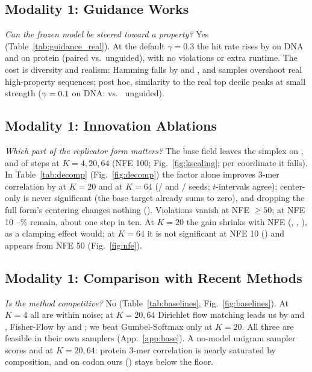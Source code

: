 \documentclass{article}
\begin{document}
\subsection{Modality 1: Guidance Works}
\emph{Can the frozen model be steered toward a property?} Yes (Table~\ref{tab:guidance_real}). At the
default $\gamma=0.3$ the hit rate rises by \GRHitCIDna{} on DNA and \GRHitCIProt{} on protein
(paired vs.\ unguided), with no violations or extra runtime. The cost is diversity and realism:
Hamming falls by \GRHamCIDna{} and \GRHamCIProt, and samples overshoot real high-property
sequences; post hoc, similarity to the real top decile peaks at small strength ($\gamma=0.1$
on DNA: \GRKmerHiMidDna{} vs.\ \GRKmerHiZeroDna{} unguided).


\subsection{Modality 1: Innovation Ablations}
\emph{Which part of the replicator form matters?} The base field leaves the simplex on
\BaseViolDna, \BaseViolProt{} and \BaseViolCodon{} of steps at $K=4,20,64$ (NFE 100;
Fig.~\ref{fig:kscaling}; per coordinate it falls). In
Table~\ref{tab:decomp} (Fig.~\ref{fig:decomp}) the factor alone improves 3-mer correlation by \MultCIProt{} at $K=20$
and \MultCICodon{} at $K=64$ (\MultProtPos/\MultProtN{} and \MultCodonPos/\MultCodonN{} seeds; $t$-intervals agree); center-only
is never significant (the base target already sums to zero), and dropping the full form's centering
changes nothing (\DropCenterCICodon). Violations vanish at NFE $\ge50$; at NFE 10
\MultViolTenLo--\MultViolTenHi\% remain, about one step in ten. At $K=20$ the gain shrinks with NFE (\MultMeanProtTen, \MultMeanProtFifty,
\MultMeanProtHundred), as a clamping effect would; at $K=64$ it is not significant at NFE 10
(\MultCICodonTen) and appears from NFE 50 (Fig.~\ref{fig:nfe}).


\subsection{Modality 1: Comparison with Recent Methods}
\emph{Is the method competitive?} No (Table~\ref{tab:baselines}, Fig.~\ref{fig:baselines}). At
$K=4$ all are within noise; at $K=20,64$ Dirichlet flow matching leads us by \DirichletVsOursProt{}
and \DirichletVsOursCodon, Fisher-Flow by \FisherVsOursProt{} and \FisherVsOursCodon; we beat
Gumbel-Softmax only at $K=20$. All three are feasible in their own samplers (App.~\ref{app:base}). A
no-model unigram sampler scores \UniProtein{} and \UniCodon{} at $K=20,64$: protein 3-mer correlation
is nearly saturated by composition, and on codon ours (\OursKmerCodon) stays below the floor.
\end{document}
